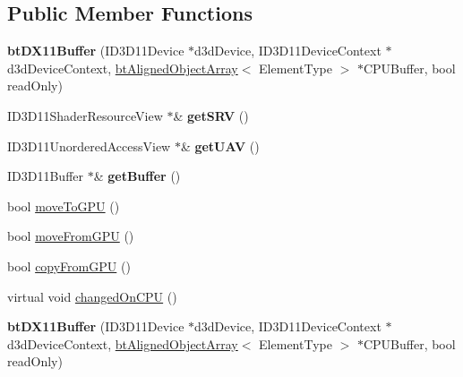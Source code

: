 \subsection*{Public Member Functions}
\begin{DoxyCompactItemize}
\item 
\mbox{\label{classbtDX11Buffer_a3d7fff3e4d181681c5722a54b20720f6}} 
{\bfseries bt\+D\+X11\+Buffer} (I\+D3\+D11\+Device $\ast$d3d\+Device, I\+D3\+D11\+Device\+Context $\ast$d3d\+Device\+Context, \hyperlink{classbtAlignedObjectArray}{bt\+Aligned\+Object\+Array}$<$ Element\+Type $>$ $\ast$C\+P\+U\+Buffer, bool read\+Only)
\item 
\mbox{\label{classbtDX11Buffer_a9ee37f8869ae336c9f6aae1aea15acd0}} 
I\+D3\+D11\+Shader\+Resource\+View $\ast$\& {\bfseries get\+S\+RV} ()
\item 
\mbox{\label{classbtDX11Buffer_a9ffb747f0b720537b57e041f3624fad9}} 
I\+D3\+D11\+Unordered\+Access\+View $\ast$\& {\bfseries get\+U\+AV} ()
\item 
\mbox{\label{classbtDX11Buffer_a73096596706e2a9c91744c7f6ff44265}} 
I\+D3\+D11\+Buffer $\ast$\& {\bfseries get\+Buffer} ()
\item 
bool \hyperlink{classbtDX11Buffer_a6d374469254cb3c03d6e18d03ca8a23c}{move\+To\+G\+PU} ()
\item 
bool \hyperlink{classbtDX11Buffer_aacac21503809131b8991c0cee42e0b1b}{move\+From\+G\+PU} ()
\item 
bool \hyperlink{classbtDX11Buffer_a116aed0cd9715e4776e08ecccc68d01b}{copy\+From\+G\+PU} ()
\item 
virtual void \hyperlink{classbtDX11Buffer_a8018a897370ed73bcca0b4907b9479b1}{changed\+On\+C\+PU} ()
\item 
\mbox{\label{classbtDX11Buffer_a3d7fff3e4d181681c5722a54b20720f6}} 
{\bfseries bt\+D\+X11\+Buffer} (I\+D3\+D11\+Device $\ast$d3d\+Device, I\+D3\+D11\+Device\+Context $\ast$d3d\+Device\+Context, \hyperlink{classbtAlignedObjectArray}{bt\+Aligned\+Object\+Array}$<$ Element\+Type $>$ $\ast$C\+P\+U\+Buffer, bool read\+Only)
\item 
\mbox{\label{classbtDX11Buffer_a9ee37f8869ae336c9f6aae1aea15acd0}} 

\end{DoxyCompactItemize}
